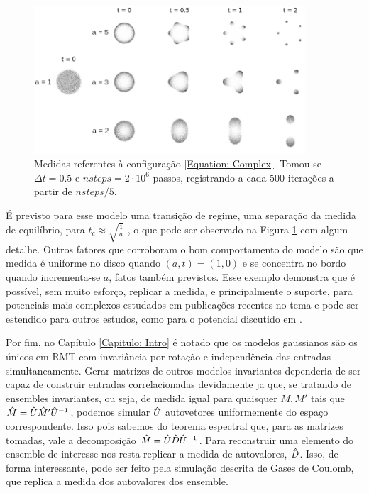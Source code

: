 \begin{figure}[ht]
	\centering
	\includegraphics[width=0.9\textwidth]{Assets/complexPotential.png}
	\caption{Medidas referentes à configuração \ref{Equation: Complex}. Tomou-se $\Delta t = 0.5$ e $nsteps = 2\cdot10^6$ passos, registrando a cada $500$ iterações a partir de $nsteps/5$.}
	\label{Figura: Complex}
\end{figure}

É previsto para esse modelo uma transição de regime, uma separação da medida de equilíbrio, para $t_c \approx \sqrt{\frac{1}{a}}$ \cite{balogh2016orthogonal}, o que pode ser observado na Figura \ref{Figura: Complex} com algum detalhe. Outros fatores que corroboram o bom comportamento do modelo são que medida é uniforme no disco quando $(a,t) = (1,0)$ e se concentra no bordo quando incrementa-se $a$, fatos também previstos. Esse exemplo demonstra que é possível, sem muito esforço, replicar a medida, e principalmente o suporte, para potenciais mais complexos estudados em publicações recentes no tema e pode ser estendido para outros estudos, como para o potencial discutido em \cite{Silva}.

Por fim, no Capítulo \ref{Capitulo: Intro} é notado que os modelos gaussianos são os únicos em RMT com invariância por rotação e independência das entradas simultaneamente. Gerar matrizes de outros modelos invariantes dependeria de ser capaz de construir entradas correlacionadas devidamente ja que, se tratando de ensembles invariantes, ou seja, de medida igual para quaisquer $M, M'$ tais que $\hat M = \hat U \hat M' \hat U^{-1}$, podemos simular $\hat U$ autovetores uniformemente do espaço correspondente. Isso pois sabemos do teorema espectral que, para as matrizes tomadas, vale a decomposição $\hat M = \hat U \hat D \hat U^{-1}$. Para reconstruir uma elemento do ensemble de interesse nos resta replicar a medida de autovalores, $\hat D$. Isso, de forma interessante, pode ser feito pela simulação descrita de Gases de Coulomb, que replica a medida dos autovalores dos ensemble.

